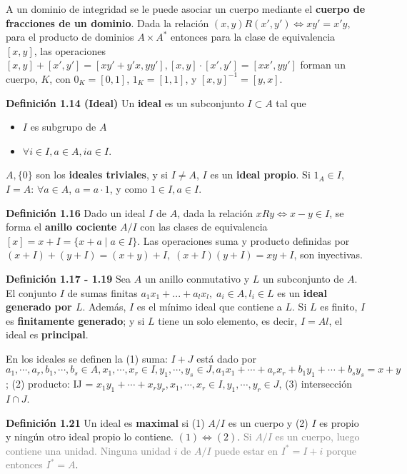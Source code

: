 \documentclass[a4paper, 11pt]{extarticle}
\newcommand{\defi}[1]{\textcolor{azul}{\textbf{Definición #1}}}
\begin{document}
\begin{multicols*}{2}
A un dominio de integridad se le puede asociar un cuerpo mediante el \textbf{cuerpo de
fracciones de un dominio}. 
Dada la relación \((x,y) R (x', y') \iff xy' = x'y\), para el producto de dominios \(A \times  A^*\) 
entonces para la clase de equivalencia \([x,y]\), las operaciones \([x,y] +
[x', y'] = [xy' + y'x, yy'], [x,y]\cdot [x',y'] = [xx', yy']\) forman un
cuerpo, \(K\), con \(0_K = [0, 1]\), \(1_K = [1,1]\), y \([x,y] ^{-1} =
 [y, x]\).

\defi{1.14 (Ideal)} Un \textbf{ideal} es un subconjunto \(I \subset A\) tal que \vspace{-1em}
\begin{itemize}
\item \(I\) es subgrupo de \(A\)
\item \(\forall i \in I, a \in A, ia \in I\).
\end{itemize}
\(A, \{ 0 \}\) son los \textbf{ideales triviales}, y si \(I \neq A\), \(I\) es un  
\textbf{ideal propio}. Si \(1_A \in I\), \(I = A\): \(\forall a \in A\), \(a = a
\cdot 1\), y como \(1 \in I, a \in I\).

\defi{1.16} Dado un ideal \(I\) de \(A\), dada la relación \(xRy \iff x-y
\in I\), se forma el \textbf{anillo cociente} \(A/I\) con las clases de equivalencia
\([x] = x + I = \{ x + a \;|\; a \in I  \}\).
Las operaciones suma y producto definidas por \((x + I) + (y + I) = (x + y) +
I, \; (x + I)(y + I) = xy + I\), son inyectivas.

\defi{1.17 - 1.19} Sea \(A\) un anillo conmutativo y \(L\) un subconjunto de \(A\). El conjunto \(I\) de sumas finitas \(a_1x_1 + ... + a_lx_l,\; a_i \in A,
l_i \in L\) es un \textbf{ideal generado por \(L\)}. Además, \(I\) es el mínimo 
ideal que contiene a \(L\). Si \(L\) es finito, \(I\) es \textbf{finitamente generado}; y si \(L\) tiene
un solo elemento, es decir, \(I = Al\), el ideal es \textbf{principal}.

En los ideales se definen la (1) suma: \(I + J\) está dado por \(a_1, \cdots,
a_r, b_1, \cdots, b_s \in A, x_1, \cdots, x_r \in I, y_1, \cdots, y_s \in J,
a_1x_1 + \cdots + a_rx_r + b_1y_1 + \cdots + b_sy_s = x + y\); (2) producto: IJ
= \(x_1y_1 + \cdots + x_ry_r, x_1, \cdots, x_r \in I, y_1, \cdots, y_r \in J\), (3) intersección \(I \cap J\).

\defi{1.21} Un ideal es \textbf{maximal} si (1) \(A/I\) es un cuerpo y (2) \(I\) es
propio y ningún otro ideal propio lo contiene. \((1) \iff (2)\).
\textcolor{gray}{\footnotesize Si \( A/I  \) es
un cuerpo, luego contiene una unidad. Ninguna unidad \( i \) de \( A/I  \) puede estar
en \( I^* = I + i \) porque entonces \( I^* = A \)}.


\end{multicols*}
\end{document}

